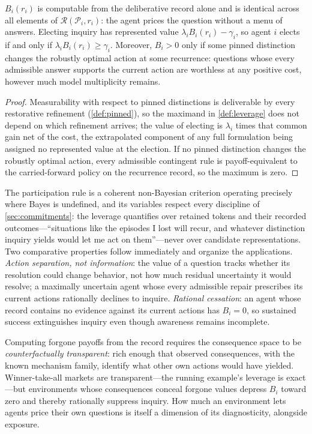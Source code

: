 \begin{proposition}
\label{prop:participation}
$B_i(r_i)$ is computable from the deliberative record alone and is identical
across all elements of $\mathcal R(\mathcal P_i,r_i)$: the agent prices the
question without a menu of answers.  Electing inquiry has represented value
$\lambda_iB_i(r_i)-\gamma_i$, so agent $i$ elects if and only if
$\lambda_iB_i(r_i)\geq\gamma_i$.  Moreover, $B_i>0$ only if some pinned
distinction changes the robustly optimal action at some recurrence:
questions whose every admissible answer supports the current action are
worthless at any positive cost, however much model multiplicity remains.
\end{proposition}

\begin{proof}
Measurability with respect to pinned distinctions is deliverable by every
restorative refinement (\cref{def:pinned}), so the maximand in
\cref{def:leverage} does not depend on which refinement arrives; the value
of electing is $\lambda_i$ times that common gain net of the cost, the
extrapolated component of any full formulation being assigned no represented
value at the election.  If no pinned distinction changes the robustly
optimal action, every admissible contingent rule is payoff-equivalent to the
carried-forward policy on the recurrence record, so the maximum is zero.
\end{proof}

The participation rule is a coherent non-Bayesian criterion operating
precisely where Bayes is undefined, and its variables respect every
discipline of \cref{sec:commitments}: the leverage quantifies over retained
tokens and their recorded outcomes---``situations like the episodes I lost
will recur, and whatever distinction inquiry yields would let me act on
them''---never over candidate representations.  Two comparative properties
follow immediately and organize the applications.  \emph{Action separation,
not information}: the value of a question tracks whether its resolution
could change behavior, not how much residual uncertainty it would resolve;
a maximally uncertain agent whose every admissible repair prescribes its
current actions rationally declines to inquire.  \emph{Rational cessation}:
an agent whose record contains no evidence against its current actions has
$B_i=0$, so sustained success extinguishes inquiry even though awareness
remains incomplete.

\begin{remark}
\label{rem:transparency}
Computing forgone payoffs from the record requires the consequence space to
be \emph{counterfactually transparent}: rich enough that observed
consequences, with the known mechanism family, identify what other own
actions would have yielded.  Winner-take-all markets are transparent---the
running example's leverage is exact---but environments whose consequences
conceal forgone values depress $B_i$ toward zero and thereby rationally
suppress inquiry.  How much an environment lets agents price their own
questions is itself a dimension of its diagnosticity, alongside exposure.
\end{remark}

